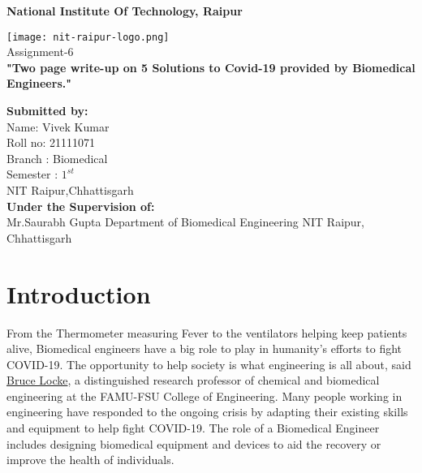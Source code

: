 \documentclass[12pt]{article}
\begin{document}
\pagestyle{empty}



   \begin{center}
       \vspace{1cm}
	   \Large
       \textbf{National Institute Of Technology, Raipur } 
       \vspace{1.5cm}
     
       \texttt{[image: nit-raipur-logo.png]}\\
       \vspace{0.8cm}
       \Huge
       Assignment-6\\
       \vspace{0.8cm}
      \textbf{ "Two page write-up on 5 Solutions to Covid-19 provided by Biomedical Engineers."}
      
	\vfill      
      
   \begin{multicols}{2} 
   \begin{flushleft}
       \large
       \textbf{Submitted by:}\\
       Name: Vivek Kumar\\
       Roll no: 21111071\\
       Branch : Biomedical\\
       Semester : $1^{st}$ \\
       NIT Raipur,Chhattisgarh\\
       \columnbreak
       \textbf{Under the Supervision of:}\\
       Mr.Saurabh Gupta
       Department of Biomedical Engineering
       NIT Raipur, Chhattisgarh
    \end{flushleft}
    \end{multicols}    
            
   \end{center}

\clearpage
\pagestyle{fancy}
\tableofcontents
\clearpage
\section{Introduction}
From the Thermometer measuring Fever to the ventilators helping keep patients alive, Biomedical engineers have a big role to play in humanity's efforts to fight COVID-19. The opportunity to help society is what engineering is all about, said \href{https://www.eng.famu.fsu.edu/cbe/people/locke}{Bruce Locke}, a distinguished research professor of chemical and biomedical engineering at the FAMU-FSU College of Engineering.
Many people working in engineering have responded to the ongoing crisis by adapting their existing skills and equipment to help fight COVID-19. The role of a Biomedical Engineer includes designing biomedical equipment and devices to aid the recovery or improve the health of individuals.
 
\end{document}
